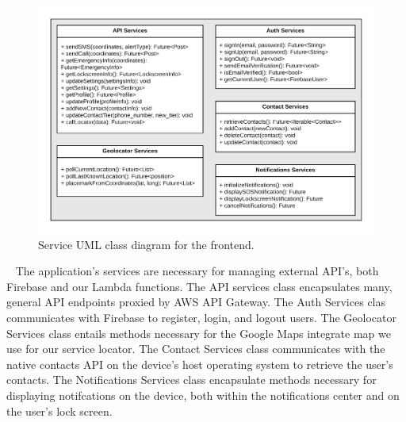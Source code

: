 \documentclass[10pt, a4paper]{article}
\begin{document}
\begin{figure}[H]
\begin{center}
\centerline{
	\includegraphics[scale=.23]{final-diagrams/Services-UML.png}
}
\caption{Service UML class diagram for the frontend.}
\end{center}	
\end{figure}

\par ~ The application's services are necessary for managing external API's, both Firebase and our Lambda functions. The API services class encapsulates many, general API endpoints proxied by AWS API Gateway. The Auth Services clas communicates with Firebase to register, login, and logout users. The Geolocator Services class entails methods necessary for the Google Maps integrate map we use for our service locator. The Contact Services class communicates with the native contacts API on the device's host operating system to retrieve the user's contacts. The Notifications Services class encapsulate methods necessary for displaying notifcations on the device, both within the notifications center and on the user's lock screen. \\
\end{document}
